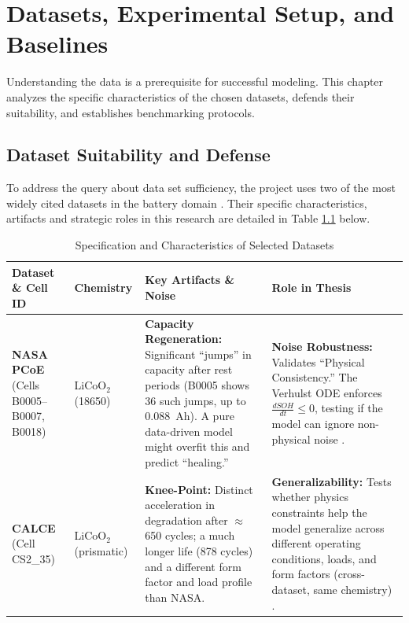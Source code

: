 \chapter{Datasets, Experimental Setup, and Baselines}
\label{ch:datasets_implementation}

Understanding the data is a prerequisite for successful modeling. This chapter analyzes the specific characteristics of the chosen datasets, defends their suitability, and establishes benchmarking protocols.

\section{Dataset Suitability and Defense}

To address the query about data set sufficiency, the project uses two of the most widely cited datasets in the battery domain \cite{nasa_datasets, he_calce}. Their specific characteristics, artifacts and strategic roles in this research are detailed in Table \ref{tab:datasets} below.

\begin{table}[H]
\centering
\caption{Specification and Characteristics of Selected Datasets}
\label{tab:datasets}
\renewcommand{\arraystretch}{1.5} %
\small %
\setlength{\tabcolsep}{4pt}        %
\begin{tabular}{|p{2.6cm}|p{1.7cm}|p{3.7cm}|p{3.7cm}|}
\hline
\textbf{Dataset \& Cell ID} & \textbf{Chemistry} & \textbf{Key Artifacts \& Noise} & \textbf{Role in Thesis} \\
\hline
\textbf{NASA PCoE} \newline (Cells B0005--B0007, B0018) & LiCoO$_2$ \newline (18650) & \textbf{Capacity Regeneration:} Significant ``jumps'' in capacity after rest periods (B0005 shows 36 such jumps, up to 0.088~Ah). A pure data-driven model might overfit this and predict ``healing.'' & \textbf{Noise Robustness:} Validates ``Physical Consistency.'' The Verhulst ODE enforces $\frac{dSOH}{dt} \leq 0$, testing if the model can ignore non-physical noise \cite{auto_regression_pf}. \\
\hline
\textbf{CALCE} \newline (Cell CS2\_35) & LiCoO$_2$ \newline (prismatic) & \textbf{Knee-Point:} Distinct acceleration in degradation after $\approx$650 cycles; a much longer life (878 cycles) and a different form factor and load profile than NASA. & \textbf{Generalizability:} Tests whether physics constraints help the model generalize across different operating conditions, loads, and form factors (cross-dataset, same chemistry) \cite{inheritance_pf}. \\
\hline
\end{tabular}
\end{table}

